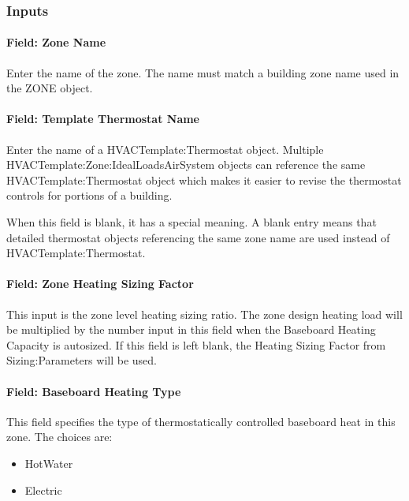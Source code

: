 \subsubsection{Inputs}\label{inputs-2-020}

\paragraph{Field: Zone Name}\label{field-zone-name-1-004}

Enter the name of the zone. The name must match a building zone name used in the ZONE object.

\paragraph{Field: Template Thermostat Name}\label{field-template-thermostat-name-1}

Enter the name of a HVACTemplate:Thermostat object. Multiple HVACTemplate:Zone:IdealLoadsAirSystem objects can reference the same HVACTemplate:Thermostat object which makes it easier to revise the thermostat controls for portions of a building.

When this field is blank, it has a special meaning. A blank entry means that detailed thermostat objects referencing the same zone name are used instead of HVACTemplate:Thermostat.

\paragraph{Field: Zone Heating Sizing Factor}\label{field-zone-heating-sizing-factor-000}

This input is the zone level heating sizing ratio. The zone design heating load will be multiplied by the number input in this field when the Baseboard Heating Capacity is autosized. If this field is left blank, the Heating Sizing Factor from Sizing:Parameters will be used.

\paragraph{Field: Baseboard Heating Type}\label{field-baseboard-heating-type}

This field specifies the type of thermostatically controlled baseboard heat in this zone. The choices are:

\begin{itemize}
\item
  HotWater
\item
  Electric
\end{itemize}

